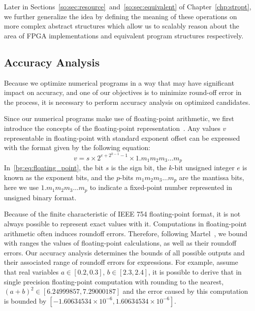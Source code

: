 Later in Sections~\ref{so:sec:resource}~and~\ref{so:sec:equivalent} of
Chapter~\ref{chp:stropt}, we further generalize the idea by defining the
meaning of these operations on more complex abstract structures which allow
us to scalably reason about the area of FPGA implementations and equivalent
program structures respectively.


\subsection{Accuracy Analysis}
\label{bg:sub:accuracy}

Because we optimize numerical programs in a way that may have significant
impact on accuracy, and one of our objectives is to minimize round-off error
in the process, it is necessary to perform accuracy analysis on optimized
candidates.

Since our numerical programs make use of floating-point arithmetic, we first
introduce the concepts of the floating-point representation~\cite{ieee754}. Any
values $v$ representable in floating-point with standard exponent offset can be
expressed with the format given by the following equation:
\begin{equation}
    v = s \times 2^{e + 2^{k - 1} - 1} \times 1.{m_1 m_2 m_3 \ldots m_p}
    \label{bg:eq:floating_point}
\end{equation}
In~\eqref{bg:eq:floating_point}, the bit $s$ is the sign bit, the $k$-bit
unsigned integer $e$ is known as the exponent bits, and the $p$-bits $m_1 m_2
m_3 \ldots m_p$ are the mantissa bits, here we use $1.{m_1 m_2 m_3 \ldots m_p}$
to indicate a fixed-point number represented in unsigned binary format.

Because of the finite characteristic of IEEE 754 floating-point format, it
is not always possible to represent exact values with it. Computations in
floating-point arithmetic often induces roundoff errors. Therefore, following
Martel~\cite{martel07}, we bound with ranges the values of floating-point
calculations, as well as their roundoff errors. Our accuracy analysis
determines the bounds of all possible outputs and their associated range of
roundoff errors for expressions. For example, assume that real variables $a
\in [0.2, 0.3]$, $b \in [2.3, 2.4]$, it is possible to derive that in single
precision floating-point computation with rounding to the nearest, ${(a + b)}^2
\in [6.24999857, 7.29000187]$ and the error caused by this computation is
bounded by $[-1.60634534\times10^{-6}, 1.60634534\times10^{-6}]$.

